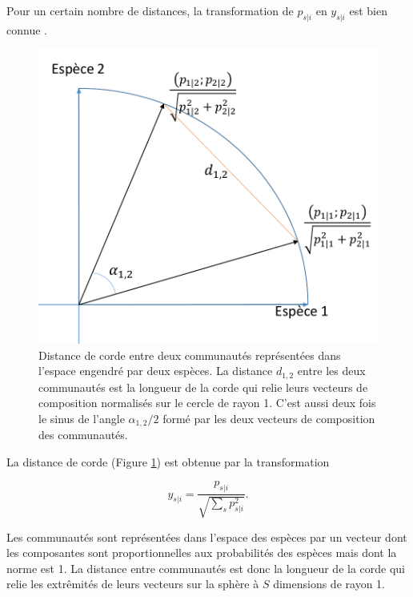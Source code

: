 \documentclass[
  11pt,
  french,
  a4paper,
  extrafontsizes,onecolumn,openright
  ]{memoir}
\begin{document}
Pour un certain nombre de distances, la transformation de \(p_{s|i}\) en \(y_{s|i}\) est bien connue \autocite{Legendre2001}.



\scriptsize

\begin{figure}

{\centering \includegraphics[width=0.8\linewidth]{images/Corde} 

}

\caption{Distance de corde entre deux communautés représentées dans l'espace engendré par deux espèces. La distance \(d_{1,2}\) entre les deux communautés est la longueur de la corde qui relie leurs vecteurs de composition normalisés sur le cercle de rayon 1. C'est aussi deux fois le sinus de l'angle \({\alpha_{1,2}}/{2}\) formé par les deux vecteurs de composition des communautés.}\label{fig:Corde}
\end{figure}

\normalsize

La distance de corde (Figure \ref{fig:Corde}) est obtenue par la transformation

\begin{equation}
  \label{eq:Corde}
  y_{s|i} = \frac{p_{s|i}}{\sqrt{\sum_s{p_{s|i}^2}}}.
\end{equation}

Les communautés sont représentées dans l'espace des espèces par un vecteur dont les composantes sont proportionnelles aux probabilités des espèces mais dont la norme est 1.
La distance entre communautés est donc la longueur de la corde qui relie les extrêmités de leurs vecteurs sur la sphère à \(S\) dimensions de rayon 1.
\end{document}
